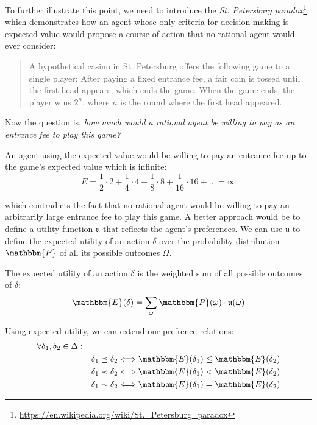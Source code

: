 To further illustrate this point, we need to introduce the \textit{St. Petersburg paradox}\footnote{\url{https://en.wikipedia.org/wiki/St._Petersburg_paradox}}, which demonstrates how an agent whose only criteria for decision-making is expected value would propose a course of action that no rational agent would ever consider:

\begin{quotation}
    A hypothetical casino in St. Petersburg offers the following game to a single player:
    After paying a fixed entrance fee, a fair coin is tossed until the first head appears, which ends the game. When the game ends, the player wins $2^n$, where $n$ is the round where the first head appeared.
\end{quotation}

Now the question is, \textit{how much would a rational agent be willing to pay as an entrance fee to play this game?}

An agent using the expected value would be willing to pay an entrance fee up to the game's expected value which is infinite:
$$  E = \frac{1}{2} \cdot 2 + \frac{1}{4} \cdot 4 + \frac{1}{8} \cdot 8 + \frac{1}{16} \cdot 16 + \dots = \infty$$

which contradicts the fact that no rational agent would be willing to pay an arbitrarily large entrance fee to play this game. A better approach would be to define a utility function $\mathfrak{u}$ that reflects the agent's preferences. We can use $\mathfrak{u}$ to define the expected utility of an action $\delta$ over the probability distribution $\mathbbm{P}$ of all its possible outcomes $\Omega$.

\begin{Tdef}
    The expected utility of an action $\delta$ is the weighted sum of all possible outcomes of $\delta$:
    $$\mathbbm{E}(\delta) = \sum_{\omega} \mathbbm{P}(\omega) \cdot \mathfrak{u}(\omega)$$
\end{Tdef}

Using expected utility, we can extend our prefrence relations:
\vspace{-0.5em}
\begin{subequations}
    \begin{align*}
    \forall \delta_1, \delta_2 \in \Delta: \quad& \\
    & \delta_1 \preceq \delta_2 \Longleftrightarrow \mathbbm{E}(\delta_1) \leq \mathbbm{E}(\delta_2) \\
    & \delta_1 \prec \delta_2 \Longleftrightarrow \mathbbm{E}(\delta_1) < \mathbbm{E}(\delta_2) \\
    & \delta_1 \sim \delta_2 \Longleftrightarrow \mathbbm{E}(\delta_1) = \mathbbm{E}(\delta_2) \\
    \end{align*}
\end{subequations}


